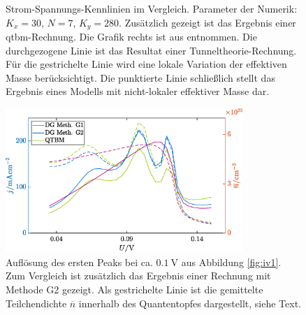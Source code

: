 \begin{figure}
\begin{subfigure}[b]{0.48\textwidth}
        \label{fig:frensley_iv}
    \end{subfigure}
    \caption[]
    {Strom-Spannungs-Kennlinien im Vergleich. Parameter der Numerik: $K_x=30$, $N=7$, $K_y=280$. Zusätzlich gezeigt ist das Ergebnis einer \ac{qtbm}-Rechnung. Die Grafik rechts ist aus \cite{frensley3} entnommen. Die durchgezogene Linie ist das Resultat einer Tunneltheorie-Rechnung. Für die gestrichelte Linie wird eine lokale Variation der effektiven Masse berücksichtigt. Die punktierte Linie schließlich stellt das Ergebnis eines Modells mit nicht-lokaler effektiver Masse dar.}
    \label{fig:iv_vergleich1}
\end{figure}

\begin{figure}
  \centering
  \includegraphics[width=0.8\textwidth]{plots/IV/IV_qtbm_dg_fein.eps}
  \caption{Auflösung des ersten Peaks bei ca. $\SI{0.1}{\volt}$ aus Abbildung \ref{fig:iv1}. Zum Vergleich ist zusätzlich das Ergebnis einer Rechnung mit Methode G2 gezeigt. Als gestrichelte Linie ist die gemittelte Teilchendichte $\overline{n}$ innerhalb des Quantentopfes dargestellt, siehe Text.}
  \label{fig:iv2}
\end{figure}

